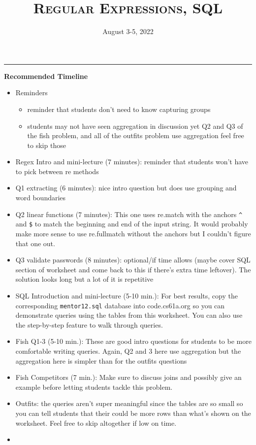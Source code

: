 \documentclass{exam}
\title{\textsc{Regular Expressions, SQL}}
\date{August 3-5, 2022}
\begin{document}
\maketitle
\rule{\textwidth}{0.15em}
\fontsize{12}{15}\selectfont

\begin{guide}
\begin{blocksection}
    \textbf{Recommended Timeline}
    \begin{itemize}
        \item Reminders
        \begin{itemize}
            \item reminder that students don't need to know capturing groups
            \item students may not have seen aggregation in discussion yet
            Q2 and Q3 of the fish problem, and all of the outfits problem use aggregation
            feel free to skip those
        \end{itemize}
        \item Regex Intro and mini-lecture (7 minutes): reminder that students won't have to pick between re methods
        \item Q1 extracting (6 minutes): nice intro question but does use grouping and word boundaries
        \item Q2 linear functions (7 minutes): This one uses re.match with the anchors \lstinline{^} and \lstinline{$} to match the beginning and end of the input string.
        It would probably make more sense to use re.fullmatch without the anchors but I couldn't figure that one out.
        \item Q3 validate passwords (8 minutes): optional/if time allows (maybe cover SQL section of worksheet and come back to this if there's extra time leftover). The solution looks long but a lot of it is repetitive
        \item SQL Introduction and mini-lecture (5-10 min.): For best results, copy the corresponding 
        \texttt{mentor12.sql} database into code.cs61a.org so you can demonstrate queries using 
        the tables from this worksheet. You can also use the step-by-step feature to walk through queries.
        \item Fish Q1-3 (5-10 min.): These are good intro questions for students to be more comfortable writing queries. Again, Q2 and 3 here use aggregation but the aggregation here is simpler than for the outfits questions
        \item Fish Competitors (7 min.): Make sure to discuss joins and possibly give an example
        before letting students tackle this problem.
        \item Outfits: the queries aren't super meaningful since the tables are so small so you can tell students that their could be more rows than what's shown on the worksheet.
        Feel free to skip altogether if low on time.
        \item 
    \end{itemize}
\end{blocksection}
\newpage
\end{guide}
\end{document}
